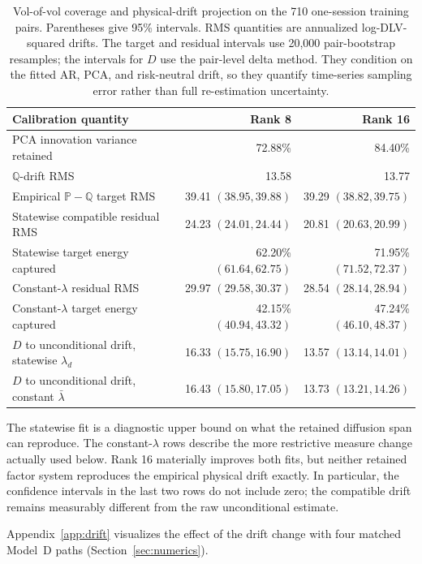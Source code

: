 \documentclass[smallextended,envcountsame,envcountsect]{svjour3}
\newcommand{\Q}{\mathbb Q}
\newcommand{\PP}{\mathbb P}
\begin{document}
\begin{table}[H]
\centering
\small
\begin{tabular}{lrr}
\toprule
Calibration quantity & Rank 8 & Rank 16\\
\midrule
PCA innovation variance retained & 72.88\% & 84.40\%\\
$\Q$-drift RMS & 13.58 & 13.77\\
Empirical $\PP-\Q$ target RMS
  & 39.41 $(38.95,39.88)$ & 39.29 $(38.82,39.75)$\\
Statewise compatible residual RMS
  & 24.23 $(24.01,24.44)$ & 20.81 $(20.63,20.99)$\\
Statewise target energy captured
  & 62.20\% $(61.64,62.75)$ & 71.95\% $(71.52,72.37)$\\
Constant-$\lambda$ residual RMS
  & 29.97 $(29.58,30.37)$ & 28.54 $(28.14,28.94)$\\
Constant-$\lambda$ target energy captured
  & 42.15\% $(40.94,43.32)$ & 47.24\% $(46.10,48.37)$\\
$D$ to unconditional drift, statewise $\lambda_d$
  & 16.33 $(15.75,16.90)$ & 13.57 $(13.14,14.01)$\\
$D$ to unconditional drift, constant $\bar\lambda$
  & 16.43 $(15.80,17.05)$ & 13.73 $(13.21,14.26)$\\
\bottomrule
\end{tabular}
\caption{Vol-of-vol coverage and physical-drift projection on the 710
one-session training pairs.  Parentheses give 95\% intervals.  RMS quantities
are annualized log-DLV-squared drifts.  The target and residual intervals use
20,000 pair-bootstrap resamples; the intervals for $D$ use the pair-level
delta method.  They condition on the fitted AR, PCA, and risk-neutral drift,
so they quantify time-series sampling error rather than full re-estimation
uncertainty.}
\label{tab:numerics-calibration}
\end{table}

The statewise fit is a diagnostic upper bound on what the retained diffusion
span can reproduce.  The constant-$\lambda$ rows describe the more restrictive
measure change actually used below.  Rank 16 materially improves both fits,
but neither retained factor system reproduces the empirical physical drift
exactly.  In particular, the confidence intervals in the last two rows do not
include zero; the compatible drift remains measurably different from the raw
unconditional estimate.

Appendix~\ref{app:drift} visualizes the effect of the drift change
with four matched Model~D paths (Section~\ref{sec:numerics}).  
\end{document}
